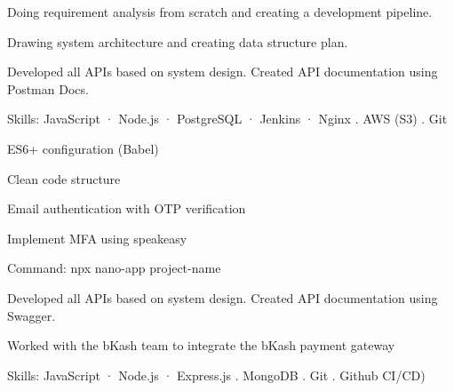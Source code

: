 \documentclass[]{deedy-resume-openfont}
\begin{document}
\begin{minipage}[t]{0.65\textwidth}
\vspace{\topsep}
\begin{tightemize}
\item Doing requirement analysis from scratch and creating a development pipeline.
\item Drawing system architecture and creating data structure plan.
\item Developed all APIs based on system design. Created API documentation using Postman Docs.
\item Skills: JavaScript · Node.js · PostgreSQL · Jenkins · Nginx . AWS (S3) . Git 
\end{tightemize}
\sectionsep

\vspace{\topsep}
\begin{tightemize}
\item ES6+ configuration (Babel)
\item Clean code structure
\item Email authentication with OTP verification
\item Implement MFA using speakeasy
\item Command: npx nano-app project-name
\end{tightemize}
\sectionsep

\vspace{\topsep}
\begin{tightemize}
\item Developed all APIs based on system design. Created API documentation using Swagger.
\item Worked with the bKash team to integrate the bKash payment gateway 
\item Skills: JavaScript · Node.js · Express.js . MongoDB . Git . Github CI/CD)
\end{tightemize}
\sectionsep

\end{minipage} 
\end{document}
